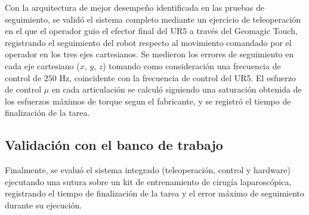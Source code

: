 Con la arquitectura de mejor desempeño identificada en las pruebas de
seguimiento, se validó el sistema completo mediante un ejercicio de
teleoperación en el que el operador guio el efector final del UR5 a través del
Geomagic Touch, registrando el seguimiento del robot respecto al movimiento
comandado por el operador en los tres ejes cartesianos. Se medieron los errores
de seguimiento en cada eje cartesiano (\(x\), \(y\), \(z\)) tomando como
consideración
una frecuencia de control de \(250\) Hz, coincidente con la frecuencia de control
del UR5. El esfuerzo de control \(\mu\) en cada articulación se calculó
siguiendo una saturación obtenida de los esfuerzos máximos de torque segun el
fabricante, y se registró el tiempo de finalización de la tarea.

\subsection{Validación con el banco de trabajo}

Finalmente, se evaluó el sistema integrado (teleoperación, control y
hardware) ejecutando una sutura sobre un kit de entrenamiento de cirugía
laparoscópica, registrando el tiempo de finalización de la tarea y el error
máximo de seguimiento durante su ejecución.

